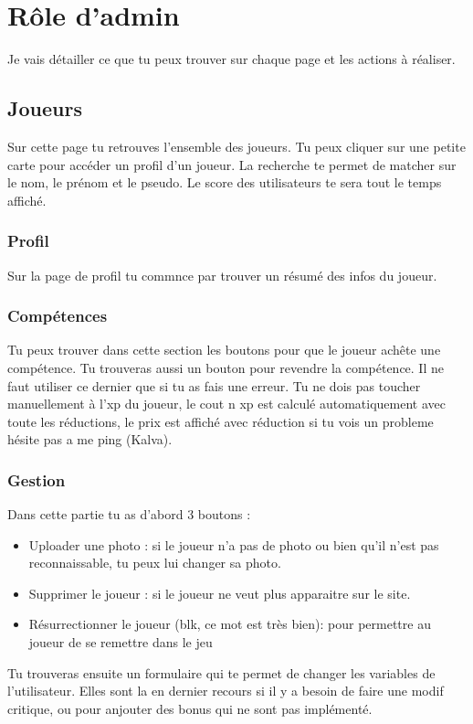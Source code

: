 \documentclass[12pt]{article}
\begin{document}
\section{Rôle d'admin}
Je vais détailler ce que tu peux trouver sur chaque page et les actions à réaliser.

\subsection{Joueurs}
Sur cette page tu retrouves l'ensemble des joueurs. Tu peux cliquer sur une petite carte pour accéder un profil d'un joueur.
La recherche te permet de matcher sur le nom, le prénom et le pseudo. Le score des utilisateurs te sera tout le temps affiché.

\subsubsection{Profil}
Sur la page de profil tu commnce par trouver un résumé des infos du joueur.

\subsubsection{Compétences}
Tu peux trouver dans cette section les boutons pour que le joueur achête une compétence. Tu trouveras aussi un bouton pour revendre la compétence. Il ne faut utiliser ce dernier que si tu as fais une erreur. Tu ne dois pas toucher manuellement à l'xp du joueur, le cout n xp est calculé automatiquement avec toute les réductions, le prix est affiché avec réduction si tu vois un probleme hésite pas a me ping (Kalva).

\subsubsection{Gestion}
Dans cette partie tu as d'abord 3 boutons :
\begin{itemize}
        \item Uploader une photo : si le joueur n'a pas de photo ou bien qu'il n'est pas reconnaissable, tu peux lui changer sa photo.
        \item Supprimer le joueur : si le joueur ne veut plus apparaitre sur le site.
        \item Résurrectionner le joueur (blk, ce mot est très bien): pour permettre au joueur de se remettre dans le jeu
\end{itemize}

Tu trouveras ensuite un formulaire qui te permet de changer les variables de l'utilisateur.
Elles sont la en dernier recours si il y a besoin de faire une modif critique, ou pour anjouter des bonus qui ne sont pas implémenté.
\end{document}
